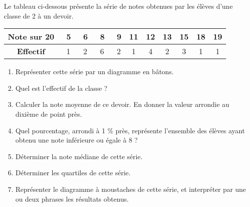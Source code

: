 
\begin{exercice}\label{exosmath-0147}

    Le tableau ci-dessous présente la série de notes obtenues par les
élèves d'une classe de 2  à un devoir.

\begin{center}
  \begin{tabular}{|c|*{10}{c|}}
    \hline
    \textbf{Note sur 20} & \ 5&\ 6&\ 8&\ 9&11&12&13&15&18&19 \\
    \hline
    \textbf{Effectif} & \ 1&\ 2&\ 6&\ 2&1&4&2&3&1&1 \\
    \hline
  \end{tabular}
\end{center}
\medskip

\begin{enumerate}
\item Représenter cette série par un diagramme en bâtons.
\item Quel est l'effectif de la classe ?
\item Calculer la note moyenne de ce devoir. En donner la valeur
  arrondie au dixième de point près.
\item Quel pourcentage, arrondi à 1 \% près, représente l'ensemble des
  élèves ayant obtenu une note inférieure ou égale à 8 ?
\item Déterminer la note médiane de cette série.
\item Déterminer les quartiles de cette série.
\item Représenter le diagramme à moustaches de cette série, et
  interpréter par une ou deux phrases les résultats obtenus.
\end{enumerate}



\end{exercice}
